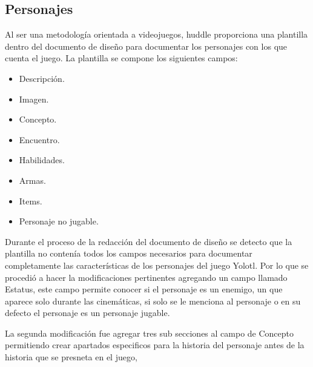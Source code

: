 \subsection{Personajes}
Al ser una metodología orientada a videojuegos, huddle proporciona una plantilla dentro del documento de diseño para documentar los personajes con los que cuenta el juego. La plantilla se compone los siguientes campos:
	\begin{itemize}
		\ietm Nombre del personaje.
		\item Descripción. 
		\item Imagen.
		\item Concepto. 
		\item Encuentro. 
		\item Habilidades. 
		\item Armas.
		\item Items.  
		\item Personaje no jugable. 
	\end{itemize}
	Durante el proceso de la redacción del documento de diseño se detecto que la plantilla no contenía todos los campos necesarios para documentar completamente las características de los personajes del juego Yolotl. Por lo que se procedió a hacer la modificaciones pertinentes agregando un campo llamado Estatus, este campo permite conocer si el personaje es un enemigo, un que aparece solo durante las cinemáticas, si solo se le menciona al personaje o en su defecto el personaje es un personaje jugable.
	\\
	\par
La segunda modificación fue agregar tres sub secciones al campo de Concepto permitiendo  crear apartados especificos para la historia del personaje antes de la historia que se presneta en el juego, 
  